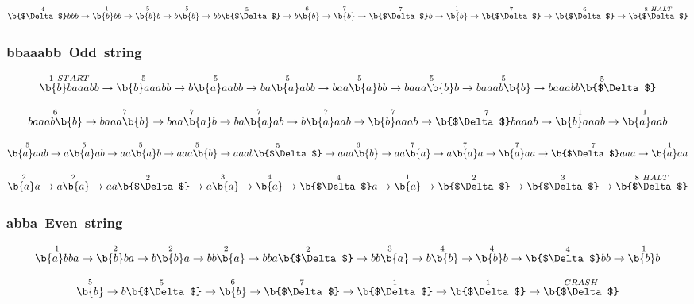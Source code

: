 \documentclass[12pt]{article}
\begin{document}
\[
\overset{4}{\b{$\Delta$}bbb}\rightarrow
\overset{1}{\b{b}bb}\rightarrow
\overset{5}{\b{b}b}\rightarrow
 \overset{5}{b\b{b}}\rightarrow
\overset{5}{bb\b{$\Delta$}}\rightarrow
\overset{6}{b\b{b}}\rightarrow
\overset{7}{\b{b}}\rightarrow
\overset{7}{\b{$\Delta$}b}\rightarrow
\overset{1}{\b{b}}\rightarrow
\overset{7}{\b{$\Delta$}}\rightarrow
\overset{6}{\b{$\Delta$}}\rightarrow
\overset{8~HALT}{\b{$\Delta$}}
\]
\subsubsection{bbaaabb~Odd~string}
\[
\overset{1~START}{\b{b}baaabb}\rightarrow
\overset{5}{\b{b}aaabb}\rightarrow
\overset{5}{b\b{a}aabb}\rightarrow
\overset{5}{ba\b{a}abb}\rightarrow
\overset{5}{baa\b{a}bb}\rightarrow
\overset{5}{baaa\b{b}b}\rightarrow
\overset{5}{baaab\b{b}}\rightarrow
\overset{5}{baaabb\b{$\Delta$} }\]

\[
\overset{6}{baaab\b{b}}\rightarrow
\overset{7}{baaa\b{b}}\rightarrow
\overset{7}{baa\b{a}b}\rightarrow
\overset{7}{ba\b{a}ab}\rightarrow
\overset{7}{b\b{a}aab}\rightarrow
\overset{7}{\b{b}aaab}\rightarrow
\overset{7}{\b{$\Delta$}baaab}\rightarrow
\overset{1}{\b{b}aaab}\rightarrow
\overset{1}{\b{a}aab}
\]

\[
\overset{5}{\b{a}aab}\rightarrow
\overset{5}{a\b{a}ab}\rightarrow
\overset{5}{aa\b{a}b}\rightarrow
\overset{5}{aaa\b{b}}\rightarrow
\overset{5}{aaab\b{$\Delta$}}\rightarrow
\overset{6}{aaa\b{b}}\rightarrow
\overset{7}{aa\b{a}}\rightarrow
\overset{7}{a\b{a}a}\rightarrow
\overset{7}{\b{a}aa}\rightarrow
\overset{7}{\b{$\Delta$}aaa}\rightarrow
\overset{1}{\b{a}aa}
\]

\[
\overset{2}{\b{a}a}\rightarrow
\overset{2}{a\b{a}}\rightarrow
\overset{2}{aa\b{$\Delta$}}\rightarrow
\overset{3}{a\b{a}}\rightarrow
\overset{4}{\b{a}}\rightarrow
\overset{4}{\b{$\Delta$}a}\rightarrow
\overset{1}{\b{a}}\rightarrow
\overset{2}{\b{$\Delta$}}\rightarrow
\overset{3}{\b{$\Delta$}}\rightarrow
\overset{8~HALT}{\b{$\Delta$}}
\]

\subsubsection{abba~Even~string}

\[
\overset{1}{\b{a}bba}\rightarrow
\overset{2}{\b{b}ba}\rightarrow
\overset{2}{b\b{b}a}\rightarrow
\overset{2}{bb\b{a}}\rightarrow
\overset{2}{bba\b{$\Delta$}}\rightarrow
\overset{3}{bb\b{a}}\rightarrow
\overset{4}{b\b{b}}\rightarrow
\overset{4}{\b{b}b}\rightarrow
\overset{4}{\b{$\Delta$}bb}\rightarrow
\overset{1}{\b{b}b}
\]

\[
\overset{5}{\b{b}}\rightarrow
\overset{5}{b\b{$\Delta$}}\rightarrow
\overset{6}{\b{b}}\rightarrow
\overset{7}{\b{$\Delta$}}\rightarrow
\overset{1}{\b{$\Delta$}}\rightarrow
\overset{1}{\b{$\Delta$}}\rightarrow
\overset{CRASH}{\b{$\Delta$}}
\]
\end{document}
